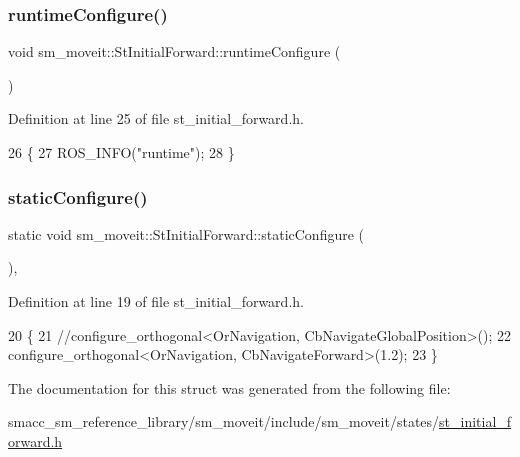 \subsubsection{\texorpdfstring{runtime\+Configure()}{runtimeConfigure()}}
{\footnotesize\ttfamily void sm\+\_\+moveit\+::\+St\+Initial\+Forward\+::runtime\+Configure (\begin{DoxyParamCaption}{ }\end{DoxyParamCaption})\hspace{0.3cm}{\ttfamily [inline]}}



Definition at line 25 of file st\+\_\+initial\+\_\+forward.\+h.


\begin{DoxyCode}
26     \{
27         ROS\_INFO(\textcolor{stringliteral}{"runtime"});
28     \}
\end{DoxyCode}
\mbox{\label{structsm__moveit_1_1StInitialForward_a573303f50ed120314581e88a366db135}} 
\subsubsection{\texorpdfstring{static\+Configure()}{staticConfigure()}}
{\footnotesize\ttfamily static void sm\+\_\+moveit\+::\+St\+Initial\+Forward\+::static\+Configure (\begin{DoxyParamCaption}{ }\end{DoxyParamCaption})\hspace{0.3cm}{\ttfamily [inline]}, {\ttfamily [static]}}



Definition at line 19 of file st\+\_\+initial\+\_\+forward.\+h.


\begin{DoxyCode}
20     \{
21         \textcolor{comment}{//configure\_orthogonal<OrNavigation, CbNavigateGlobalPosition>();}
22         configure\_orthogonal<OrNavigation, CbNavigateForward>(1.2);
23     \}
\end{DoxyCode}


The documentation for this struct was generated from the following file\+:\begin{DoxyCompactItemize}
\item 
smacc\+\_\+sm\+\_\+reference\+\_\+library/sm\+\_\+moveit/include/sm\+\_\+moveit/states/\hyperlink{include_2sm__moveit_2states_2st__initial__forward_8h}{st\+\_\+initial\+\_\+forward.\+h}\end{DoxyCompactItemize}
